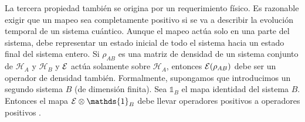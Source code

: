 La tercera propiedad también se origina por un requerimiento físico. Es
razonable exigir que un mapeo sea completamente positivo si se va a describir
la evolución temporal de un sistema cuántico. Aunque el mapeo actúa solo en una
parte del sistema, debe representar un estado inicial de todo el sistema hacia
un estado final del sistema entero. Si $\rho_{AB}$ es una matriz de densidad de
un sistema conjunto de $\mathcal{H}_A$ y $\mathcal{H}_{B}$  y $\mathcal{E}$ actúa
solamente sobre $\mathcal{H}_A$, entonces $\mathcal{E}(\rho_{AB})$  debe ser un operador
de densidad también. Formalmente, supongamos que introducimos un segundo
sistema $B$ (de dimensión finita). Sea $\mathds{1}_{B}$ el mapa identidad del
sistema $B$. Entonces el mapa $\E\otimes \mathds{1}_{B}$ debe llevar operadores
positivos a operadores positivos {\cite{nielsen_chuang_2010, preskill2020quantum}}. 

\begin{comment}

Es importante tener en cuenta que no todos los mapas positivos son
completamente positivos; la positividad completa es una condición más fuerte.
Un ejemplo de un operador positivo pero no completamente positivo es la
transpuesta, $T:\rho \mapsto {\rho}^T$, dado que \[\la \psi |{\rho}^T| \psi
\ra=\sum_{i,j} \psi _j^* {(\rho)}^T _{ji} \psi _i=\sum _{i,j} \psi _i{(\rho)}
_{ij} \psi_j^{*}=\la {\psi}^*|\rho|\psi ^*\ra,\] cumple con ser positivo para
cualquier estado $| \psi \ra$. Sin embargo $ {T} $ no es completamente
positivo. Por ejemplo,  si se toma un estado en el espacio $\mathcal{H}_A\otimes \mathcal{H}_B$ \[\Psi_{AB} \equiv \sum_i
|i,i\ra, \]con $i=0,1$. La extensión de $T$ actuando en este estado es \[T \otimes
\mathds{1}:|\Psi\rala \Psi|=\sum_{i,j}|i,i\rala j,j| \mapsto
\sum_{i,j}|j,i\rala i,j|.\]


Este estado $|\Psi\rala \Psi|$ se mapea al operador SWAP,
\begin{equation}
    \text{SWAP}=\sum_{i,j}|j,i\rala i,j|=\begin{bmatrix}
        1&0&0&0\\
        0&0&1&0\\
        0&1&0&0\\
        0&0&0&1\\
    \end{bmatrix}
\end{equation}


 Al aplicar dos veces el operador SWAP se obtiene el mismo estado inicial, por tanto el cuadrado de SWAP es la identidad y sus valores propios serán $\pm 1$. El operador SWAP tiene valores propios negativos lo que significa que $T \otimes \mathds{1}$ no es positivo, debido a que un operador positivo no lo mapea a otro operador positivo. En consecuencia $T$, no cumple con ser completamente positivo  {\cite{preskill2020quantum}}.


\end{comment}

